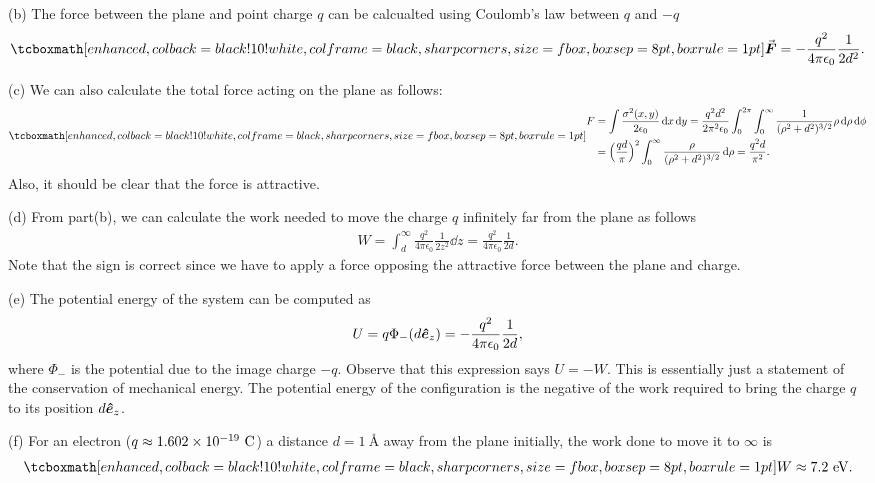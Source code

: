 {(b) The force between the plane and point charge $q$ can be calcualted using Coulomb's law between $q$ and $-q$
\begin{eqnarray}
    \eqbox{ \va*{F} = - \frac{q^2}{4 \pi \epsilon_0} \frac{1}{2d^2} }
.\end{eqnarray}

(c) We can also calculate the total force acting on the plane as follows:
\begin{eqnarray}
    \eqbox{
   \begin{aligned}
       F &= \int \frac{\sigma^2(x,y)}{2 \epsilon_0} \dd{x} \dd{y} = \frac{q^2 d^2}{2 \pi^2 \epsilon_0} \int_{0}^{2 \pi} \int_{0}^{\infty} \frac{1}{(\rho^2 + d^2)^{3/2}} \rho \dd{\rho} \dd{\phi} \\
         &= \Big( \frac{q d}{\pi} \Big)^2 \int_{0}^{\infty} \frac{\rho}{(\rho^2 + d^2)^{3/2}} \dd{\rho} = \frac{q^2 d}{\pi^2}
   .\end{aligned} 
}
\end{eqnarray}
Also, it should be clear that the force is attractive.

(d) From part(b), we can calculate the work needed to move the charge $q$ infinitely far from the plane as follows
\begin{eqnarray}
    W = \int_{d}^{\infty} \frac{q^2}{4 \pi \epsilon_0} \frac{1}{2 z^2} \dd{z} = \frac{q^2}{4 \pi \epsilon_0} \frac{1}{2 d}
.\end{eqnarray}
Note that the sign is correct since we have to apply a force opposing the attractive force between the plane and charge.

(e) The potential energy of the system can be computed as
\begin{eqnarray}
    U = q \Phi_{-}(d \vu*{e}_{z}) = - \frac{q^2}{4 \pi \epsilon_0} \frac{1}{2 d}
,\end{eqnarray}
where $\Phi_{-}$ is the potential due to the image charge $-q$.
Observe that this expression says $U = -W$.
This is essentially just a statement of the conservation of mechanical energy.
The potential energy of the configuration is the negative of the work required to bring the charge $q$ to its position $d \vu*{e}_{z}$.

(f) For an electron ($q \approx 1.602 \times 10^{-19}~{\rm C}$) a distance $d = \SI{1}{\angstrom}$ away from the plane initially, the work done to move it to $\infty$ is
\begin{eqnarray}
    \eqbox{ W \approx 7.2~{\rm eV} }
.\end{eqnarray}


}


